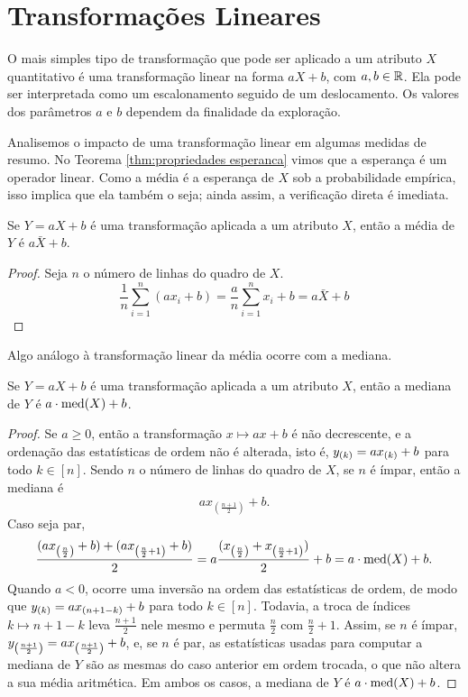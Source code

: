 \section{Transformações Lineares}

O mais simples tipo de transformação que pode ser aplicado a um atributo $X$ quantitativo
é uma transformação linear na forma $aX+b$, com $a, b \in \mathbb{R}$.
Ela pode ser interpretada como um escalonamento seguido de um deslocamento.
Os valores dos parâmetros $a$ e $b$ dependem da finalidade da exploração.

Analisemos o impacto de uma transformação linear em algumas medidas de resumo.
No Teorema \ref{thm:propriedades esperanca} vimos que a esperança é um operador linear.
Como a média é a esperança de $X$ sob a probabilidade empírica, isso implica que ela também
o seja; ainda assim, a verificação direta é imediata.

\begin{prop:media linear}
\label{prop:media linear}
Se $Y=aX+b$ é uma transformação aplicada a um atributo $X$, então a média de $Y$ é
$a \bar X + b$.
\end{prop:media linear}
\begin{proof}
Seja $n$ o número de linhas do quadro de $X$.
\[
    \frac 1 n \sum_{i=1}^n (ax_i + b) = \frac a n \sum_{i=1}^n x_i + b = a \bar X + b
\]
\end{proof}

Algo análogo à transformação linear da média ocorre com a mediana.

\begin{prop:mediana linear}
\label{prop:mediana linear}
Se $Y=aX+b$ é uma transformação aplicada a um atributo $X$, então a mediana de $Y$ é
$a \cdot \mathrm{med}\!\left(X\right) + b$.
\end{prop:mediana linear}
\begin{proof}
Se $a \ge 0$, então a transformação $x \mapsto ax + b$ é não decrescente, e a ordenação
das estatísticas de ordem não é alterada, isto é, $y_{\left(k\right)} = a x_{\left(k\right)} + b$ para todo
$k \in [n]$.
Sendo $n$ o número de linhas do quadro de $X$, se $n$ é ímpar, então a mediana é
\[
    a x_{(\frac{n+1}{2})} + b.
\]
Caso seja par,
\[
   \frac{(a x_{\left(\frac n 2\right)} + b) + (a x_{\left(\frac{n}{2}+1\right)} + b)}{2} =
    a\frac{(x_{\left(\frac n 2\right)} + x_{\left(\frac{n}{2}+1\right)})}{2} + b =
    a \cdot \mathrm{med}\!\left(X\right) + b.
\]
Quando $a < 0$, ocorre uma inversão na ordem das estatísticas de ordem, de modo que
$y_{\left(k\right)} = a x_{\left(n+1-k\right)} + b$ para todo $k \in [n]$.
Todavia, a troca de índices $k \mapsto n+1-k$ leva $\frac{n+1}{2}$ nele mesmo e permuta
$\frac n 2$ com $\frac n 2 + 1$.
Assim, se $n$ é ímpar, $y_{\left(\frac{n+1}{2}\right)} = a x_{\left(\frac{n+1}{2}\right)} + b$, e, se $n$
é par, as estatísticas usadas para computar a mediana de $Y$ são as mesmas do caso anterior
em ordem trocada, o que não altera a sua média aritmética.
Em ambos os casos, a mediana de $Y$ é $a \cdot \mathrm{med}\!\left(X\right) + b$.
\end{proof}

